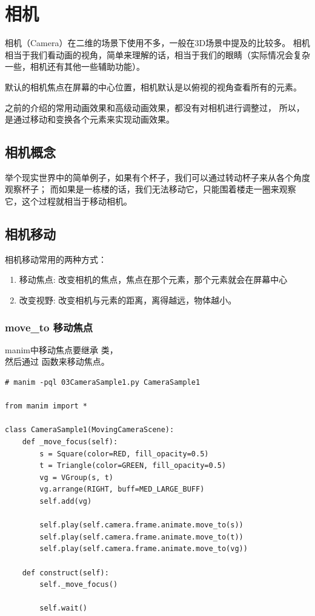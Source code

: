 \section{相机}
\label{sec:manim_animation_camera}

相机（Camera）在二维的场景下使用不多，一般在3D场景中提及的比较多。 
相机相当于我们看动画的视角，简单来理解的话，相当于我们的眼睛（实际情况会复杂一些，相机还有其他一些辅助功能）。

默认的相机焦点在屏幕的中心位置，相机默认是以俯视的视角查看所有的元素。

之前的介绍的常用动画效果和高级动画效果，都没有对相机进行调整过， 
所以，是通过移动和变换各个元素来实现动画效果。

\subsection{相机概念}
\label{subsec:manim_animation_camera_concept}
举个现实世界中的简单例子，如果有个杯子，我们可以通过转动杯子来从各个角度观察杯子； 而如果是一栋楼的话，我们无法移动它，只能围着楼走一圈来观察它，这个过程就相当于移动相机。

\subsection{相机移动}
\label{subsec:manim_animation_camera_move}
相机移动常用的两种方式：
\begin{enumerate}[label=\arabic*)]
    \item 移动焦点: 改变相机的焦点，焦点在那个元素，那个元素就会在屏幕中心
    \item 改变视野: 改变相机与元素的距离，离得越远，物体越小。
\end{enumerate}

\subsubsection{move\_to 移动焦点}
\label{subsubsec:manim_animation_camera_move_moveto}
manim中移动焦点要继承  类， \\
然后通过 函数来移动焦点。

\begin{lstlisting}[style=pythonstyle]
# manim -pql 03CameraSample1.py CameraSample1    

from manim import *

class CameraSample1(MovingCameraScene):
    def _move_focus(self):
        s = Square(color=RED, fill_opacity=0.5)
        t = Triangle(color=GREEN, fill_opacity=0.5)
        vg = VGroup(s, t)
        vg.arrange(RIGHT, buff=MED_LARGE_BUFF)
        self.add(vg)

        self.play(self.camera.frame.animate.move_to(s))
        self.play(self.camera.frame.animate.move_to(t))
        self.play(self.camera.frame.animate.move_to(vg))

    def construct(self):
        self._move_focus()

        self.wait()
\end{lstlisting}


